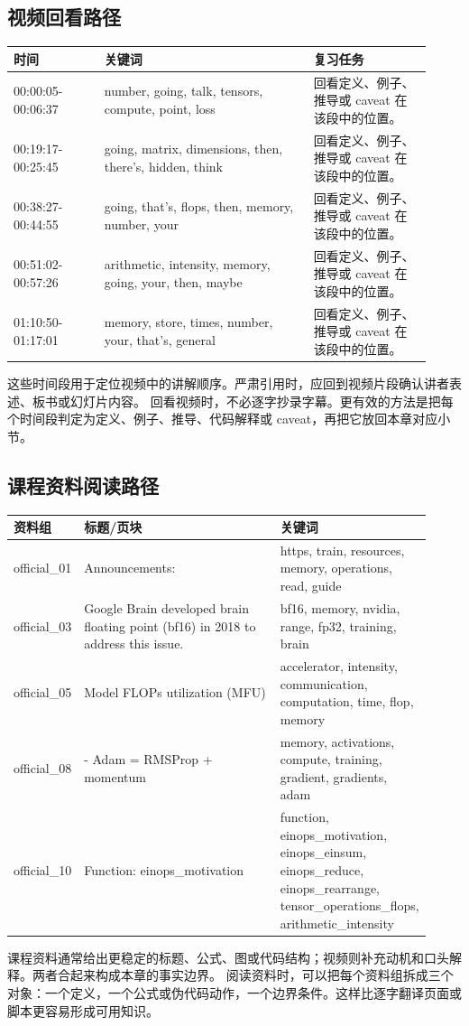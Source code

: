 \documentclass[a4paper]{article}
\begin{document}
\subsection{视频回看路径}
\begin{longtable}{p{0.20\linewidth}p{0.46\linewidth}p{0.26\linewidth}}
\toprule
\textbf{时间} & \textbf{关键词} & \textbf{复习任务}\\
\midrule
00:00:05-00:06:37 & number, going, talk, tensors, compute, point, loss & 回看定义、例子、推导或 caveat 在该段中的位置。\\
00:19:17-00:25:45 & going, matrix, dimensions, then, there's, hidden, think & 回看定义、例子、推导或 caveat 在该段中的位置。\\
00:38:27-00:44:55 & going, that's, flops, then, memory, number, your & 回看定义、例子、推导或 caveat 在该段中的位置。\\
00:51:02-00:57:26 & arithmetic, intensity, memory, going, your, then, maybe & 回看定义、例子、推导或 caveat 在该段中的位置。\\
01:10:50-01:17:01 & memory, store, times, number, your, that's, general & 回看定义、例子、推导或 caveat 在该段中的位置。\\
\bottomrule
\end{longtable}
这些时间段用于定位视频中的讲解顺序。严肃引用时，应回到视频片段确认讲者表述、板书或幻灯片内容。
回看视频时，不必逐字抄录字幕。更有效的方法是把每个时间段判定为定义、例子、推导、代码解释或 caveat，再把它放回本章对应小节。
\subsection{课程资料阅读路径}
\begin{longtable}{p{0.14\linewidth}p{0.48\linewidth}p{0.30\linewidth}}
\toprule
\textbf{资料组} & \textbf{标题/页块} & \textbf{关键词}\\
\midrule
official\_01 & Announcements: & https, train, resources, memory, operations, read, guide\\
official\_03 & Google Brain developed brain floating point (bf16) in 2018 to address this issue. & bf16, memory, nvidia, range, fp32, training, brain\\
official\_05 & Model FLOPs utilization (MFU) & accelerator, intensity, communication, computation, time, flop, memory\\
official\_08 & - Adam = RMSProp + momentum & memory, activations, compute, training, gradient, gradients, adam\\
official\_10 & Function: einops\_motivation & function, einops\_motivation, einops\_einsum, einops\_reduce, einops\_rearrange, tensor\_operations\_flops, arithmetic\_intensity\\
\bottomrule
\end{longtable}
课程资料通常给出更稳定的标题、公式、图或代码结构；视频则补充动机和口头解释。两者合起来构成本章的事实边界。
阅读资料时，可以把每个资料组拆成三个对象：一个定义，一个公式或伪代码动作，一个边界条件。这样比逐字翻译页面或脚本更容易形成可用知识。
\end{document}
